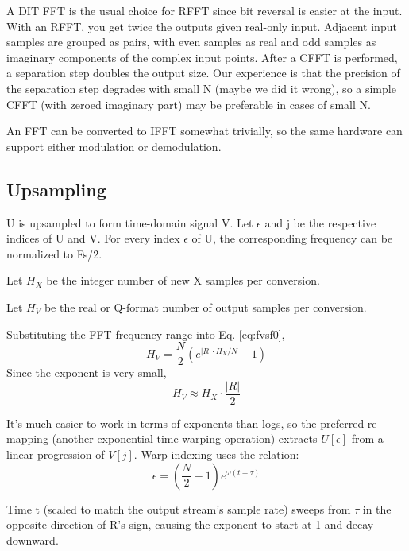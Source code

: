 A DIT FFT is the usual choice for RFFT since bit reversal is easier at the input.
With an RFFT, you get twice the outputs given real-only input.
Adjacent input samples are grouped as pairs, with even samples as real and odd
samples as imaginary components of the complex input points.
After a CFFT is performed, a separation step doubles the output size.
Our experience is that the precision of the separation step degrades with small N
(maybe we did it wrong), so a simple CFFT (with zeroed imaginary part)
may be preferable in cases of small N.

An FFT can be converted to IFFT somewhat trivially, so the same hardware can
support either modulation or demodulation.

\subsection{Upsampling}

U is upsampled to form time-domain signal V.
Let $\epsilon$ and j be the respective indices of U and V.
For every index $\epsilon$ of U, the corresponding frequency can be normalized
to Fs/2.

Let $H_X$ be the integer number of new X samples per conversion.

Let $H_V$ be the real or Q-format number of output samples per conversion.

Substituting the FFT frequency range into Eq. \ref{eq:fvsf0},
\begin{equation}  \label{eq:hv}
H_V = \frac{N}{2} \left( e^{|R| \cdot H_X / N} - 1 \right)
\end{equation}
Since the exponent is very small,
\begin{equation}
H_V \approx H_X \cdot \frac{|R|}{2}
\end{equation}

It's much easier to work in terms of exponents than logs,
so the preferred re-mapping (another exponential time-warping operation)
extracts $U[\epsilon]$ from a linear progression of $V[j]$.
Warp indexing uses the relation:
\begin{equation}
\epsilon = \left(\frac{N}{2}-1\right) e^{\omega(t - \tau)}
\end{equation}

Time t (scaled to match the output stream's sample rate) sweeps from $\tau$
in the opposite direction of R's sign,
causing the exponent to start at 1 and decay downward.

